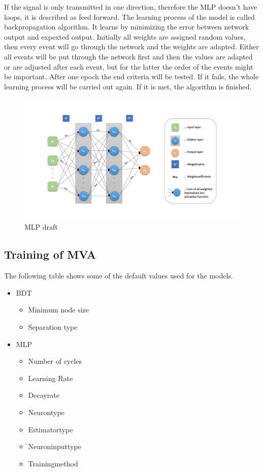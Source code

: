 \documentclass[11pt]{scrartcl}
\begin{document}
	If the signal is only transmitted in one direction, therefore the MLP doesn't have loops, it is described as feed forward. The learning process of the model is called backpropagation algorithm. It learns by minimizing the error between network output and expexted output. Initially all weights are assigned random values, then every event will go through the network and the weights are adapted. Either all events will be put through the network first and then the values are adapted or are adjusted after each event, but for the latter the order of the events might be important. After one epoch the end criteria will be tested. If it fails, the whole learning process will be carried out again. If it is met, the algorithm is finished.
	
\begin{figure}[H]
	\begin{center}
	\includegraphics[width=1\textwidth]{figures/MLP.png}
	\caption{MLP draft}
	\label{fig:MLP}
	\end{center}
\end{figure}

	\subsection{Training of MVA}
	
	The following table shows some of the default values used for the models.
	
		\begin{itemize}
  			\item BDT
  					\begin{itemize}
  					\item Minimum node size
  					\item Separation type
  					\end{itemize}
  		  	\item MLP
  					\begin{itemize}
  					\item Number of cycles
  					\item Learning Rate
  					\item Decayrate
  					\item Neurontype
  					\item Estimatortype
  					\item Neuroninputtype
  					\item Trainingmethod
  					\end{itemize}		
		\end{itemize}
		
\end{document}
